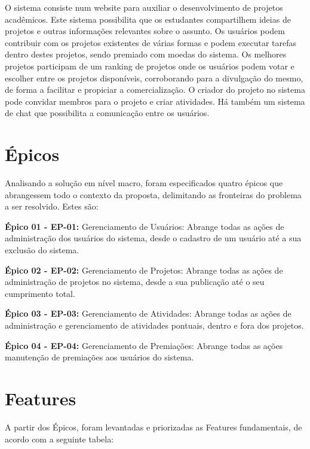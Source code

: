 \begin{apendicesenv}
O sistema consiste num website para auxiliar o desenvolvimento de projetos acadêmicos. Este sistema possibilita que os estudantes compartilhem ideias de projetos e outras informações relevantes sobre o assunto. Os usuários podem contribuir com os projetos existentes de várias formas e podem executar tarefas dentro destes projetos, sendo premiado com moedas do sistema. Os melhores projetos participam de um ranking de projetos onde os usuários podem votar e escolher entre os projetos disponíveis, corroborando para a divulgação do mesmo, de forma a facilitar e propiciar a comercialização. O criador do projeto no sistema pode convidar membros para o projeto e criar atividades. Há também um sistema de chat que possibilita a comunicação entre os usuários.

\section{Épicos}

Analisando a solução em nível macro, foram especificados quatro épicos que abrangessem todo o contexto da proposta, delimitando as fronteiras do problema a ser resolvido. Estes são:

\textbf{Épico 01 - EP-01:} Gerenciamento de Usuários: Abrange todas as ações de administração dos usuários do sistema, desde o cadastro de um usuário até a sua exclusão do sistema.

\textbf{Épico 02 - EP-02:} Gerenciamento de Projetos: Abrange todas as ações de administração de projetos no sistema, desde a sua publicação até o seu cumprimento total.

\textbf{Épico 03 - EP-03:} Gerenciamento de Atividades: Abrange todas as ações de administração e gerenciamento de atividades pontuais, dentro e fora dos projetos.

\textbf{Épico 04 - EP-04:} Gerenciamento de Premiações: Abrange todas as ações manutenção de premiações aos usuários do sistema.

\section{Features}

A partir dos Épicos, foram levantadas e priorizadas as Features fundamentais, de acordo com a seguinte tabela:


\end{apendicesenv}

